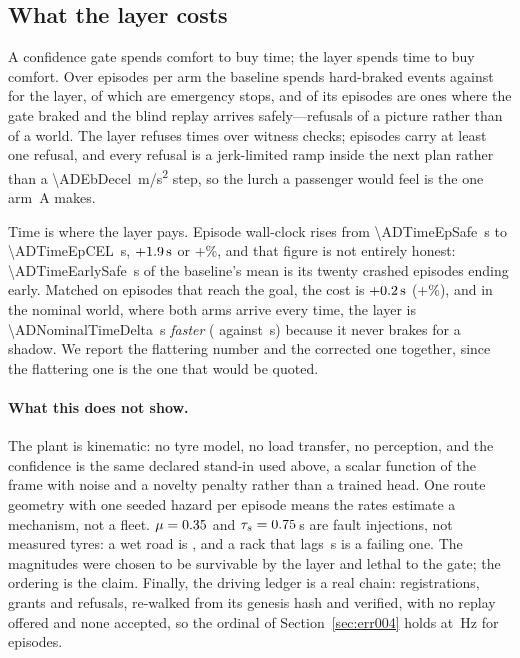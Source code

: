 \documentclass[conference]{IEEEtran}
\theoremstyle{definition}
\begin{document}
\subsection{What the layer costs}

A confidence gate spends comfort to buy time; the layer spends time to buy
comfort. Over \ADEpisodesPerArm{} episodes per
arm the baseline spends \ADSafeHarsh{} hard-braked events against \ADCELHarsh{}
for the layer, of which \ADSafeEBN{} are emergency stops, and
\ADSafeEBFalseEp{} of its episodes are ones where the gate braked and the blind
replay arrives safely---refusals of a picture rather than of a world. The layer
refuses \ADCELRef{} times over \ADCELWitnessChecks{} witness checks;
\ADCELRefEp{} episodes carry at least one refusal, and every refusal is a
jerk-limited ramp inside the next plan rather than a \SI{\ADEbDecel}{m/s^2}
step, so the lurch a passenger would feel is the one arm~A makes.

Time is where the layer pays. Episode wall-clock rises from
\SI{\ADTimeEpSafe}{s} to \SI{\ADTimeEpCEL}{s}, $+\SI{1.9}{s}$ or
+\ADTimeEpPct\%, and that figure is not entirely honest:
\SI{\ADTimeEarlySafe}{s} of the baseline's mean is its twenty crashed episodes
ending early. Matched on episodes that reach the goal, the cost is
$+\SI{0.2}{s}$ (+\ADTimeArrPct\%), and in the nominal world, where
both arms arrive every time, the layer is \SI{\ADNominalTimeDelta}{s}
\emph{faster} (\ADNominalTimeSafe{} against \ADNominalTimeCEL{}\,s) because it
never brakes for a shadow. We report the flattering number and the corrected one
together, since the flattering one is the one that would be quoted.

\paragraph{What this does not show.} The plant is kinematic: no tyre model, no
load transfer, no perception, and the confidence is the same declared stand-in
used above, a scalar function of the frame with noise and a novelty penalty
rather than a trained head. One route geometry with one seeded hazard per
episode means the rates estimate a mechanism, not a fleet. $\mu=0.35$ and
$\tau_s=0.75$\,s are fault injections, not measured tyres: a wet road is
\ADMuWet, and a rack that lags \ADTauSWorn\,s is a failing one. The magnitudes
were chosen to be survivable by the layer and lethal to the gate; the ordering
is the claim. Finally, the driving ledger is a real chain: \ADRegistrations{}
registrations, \ADGrants{} grants and \ADLedgerRefusals{} refusals, re-walked
from its genesis hash and verified, with no replay offered and none accepted, so
the ordinal of Section~\ref{sec:err004} holds at \ADWitnessHz\,Hz for
\ADTotalEpisodes{} episodes.
\end{document}
